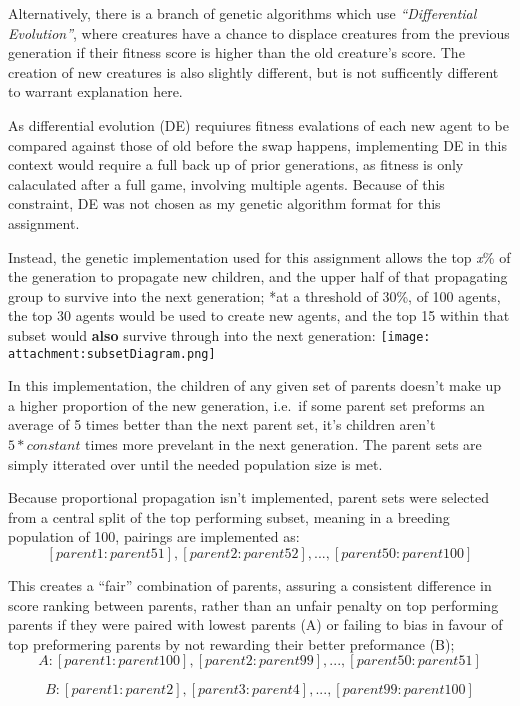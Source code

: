 \documentclass[
]{article}
\begin{document}
Alternatively, there is a branch of genetic algorithms which use
\emph{``Differential Evolution''}, where creatures have a chance to
displace creatures from the previous generation if their fitness score
is higher than the old creature's score. The creation of new creatures
is also slightly different, but is not sufficently different to warrant
explanation here.

As differential evolution (DE) requiures fitness evalations of each new
agent to be compared against those of old before the swap happens,
implementing DE in this context would require a full back up of prior
generations, as fitness is only calaculated after a full game, involving
multiple agents. Because of this constraint, DE was not chosen as my
genetic algorithm format for this assignment.

Instead, the genetic implementation used for this assignment allows the
top \emph{x}\% of the generation to propagate new children, and the
upper half of that propagating group to survive into the next
generation; *at a threshold of 30\%, of 100 agents, the top 30 agents
would be used to create new agents, and the top 15 within that subset
would \textbf{also} survive through into the next generation:
\texttt{[image: attachment:subsetDiagram.png]}

In this implementation, the children of any given set of parents doesn't
make up a higher proportion of the new generation, i.e.~if some parent
set preforms an average of 5 times better than the next parent set, it's
children aren't \(5 *constant\) times more prevelant in the next
generation. The parent sets are simply itterated over until the needed
population size is met.

Because proportional propagation isn't implemented, parent sets were
selected from a central split of the top performing subset, meaning in a
breeding population of 100, pairings are implemented as:
\[[parent 1 : parent 51], [parent 2 : parent 52], ... , [parent 50 : parent 100]\]

This creates a ``fair'' combination of parents, assuring a consistent
difference in score ranking between parents, rather than an unfair
penalty on top performing parents if they were paired with lowest
parents (A) or failing to bias in favour of top preformering parents by
not rewarding their better preformance (B);
\[A: [parent 1: parent 100], [parent 2: parent 99], ... , [parent 50: parent 51]\]

\[B: [parent 1: parent 2], [parent 3: parent 4], ... , [parent 99: parent 100]\]
\end{document}
